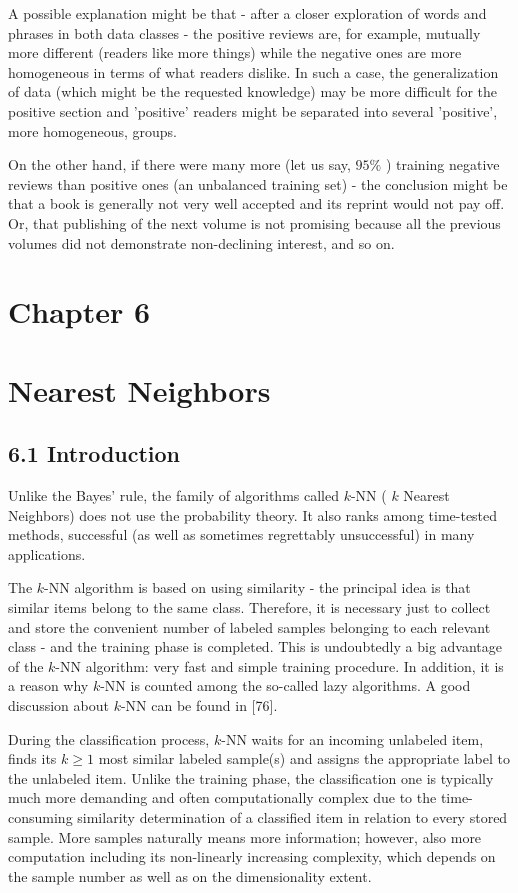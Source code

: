 \documentclass[10pt]{book}
\begin{document}
A possible explanation might be that - after a closer exploration of words and phrases in both data classes - the positive reviews are, for example, mutually more different (readers like more things) while the negative ones are more homogeneous in terms of what readers dislike. In such a case, the generalization of data (which might be the requested knowledge) may be more difficult for the positive section and 'positive' readers might be separated into several 'positive', more homogeneous, groups.

On the other hand, if there were many more (let us say, $95 \%$ ) training negative reviews than positive ones (an unbalanced training set) - the conclusion might be that a book is generally not very well accepted and its reprint would not pay off. Or, that publishing of the next volume is not promising because all the previous volumes did not demonstrate non-declining interest, and so on.

\section*{Chapter 6}
\section*{Nearest Neighbors}
\subsection*{6.1 Introduction}
Unlike the Bayes' rule, the family of algorithms called $k$-NN ( $k$ Nearest Neighbors) does not use the probability theory. It also ranks among time-tested methods, successful (as well as sometimes regrettably unsuccessful) in many applications.

The $k$-NN algorithm is based on using similarity - the principal idea is that similar items belong to the same class. Therefore, it is necessary just to collect and store the convenient number of labeled samples belonging to each relevant class - and the training phase is completed. This is undoubtedly a big advantage of the $k$-NN algorithm: very fast and simple training procedure. In addition, it is a reason why $k$-NN is counted among the so-called lazy algorithms. A good discussion about $k$-NN can be found in [76].

During the classification process, $k$-NN waits for an incoming unlabeled item, finds its $k \geq 1$ most similar labeled sample(s) and assigns the appropriate label to the unlabeled item. Unlike the training phase, the classification one is typically much more demanding and often computationally complex due to the time-consuming similarity determination of a classified item in relation to every stored sample. More samples naturally means more information; however, also more computation including its non-linearly increasing complexity, which depends on the sample number as well as on the dimensionality extent.
\end{document}
